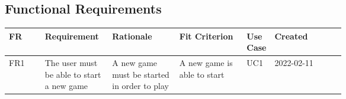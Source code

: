 \documentclass[12pt, titlepage]{article}
\begin{document}
\subsection{Functional Requirements}

\begin{longtable}{|l|p{0.2\linewidth}|p{0.2\linewidth}|p{0.2\linewidth}|p{0.06\linewidth}|l|}
\hline
\textbf{FR} & \textbf{Requirement}                                                 & \textbf{Rationale}                                                                   & \textbf{Fit Criterion}                                                                              & \textbf{Use Case} & \textbf{Created} \\ \hline
\endfirsthead
%
\endhead
%
FR1         & The user must be able to start a new game                            & A new game must be started in order to play                                          & A new game is able to start                                                                         & UC1               & 2022-02-11       \\ \hline


\end{longtable}
\end{document}
